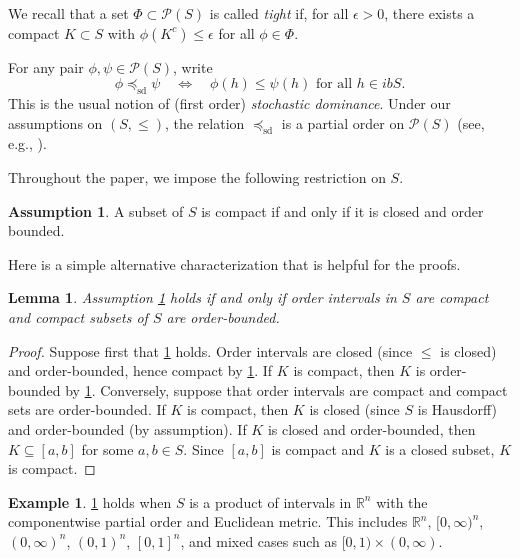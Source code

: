 \documentclass[12pt,reqno]{amsart}
\numberwithin{equation}{section}
\newtheorem{lemma}{Lemma}[section]
\theoremstyle{definition}
\newtheorem{assumption}{Assumption}[section]
\newtheorem{example}{Example}[section]
\newcommand{\1}{\mathbbm{1}}
\newcommand{\RR}{\mathbb{R}}
\newcommand{\pP}{\mathscr{P}}
\newcommand{\precsd}{\preceq_{\textrm{sd}}}
\newcommand{\navy}[1]{\textit{\textcolor{blue!40!black}{#1}}}
\begin{document}
We recall that a set $\Phi \subset \pP(S)$ is called \navy{tight} if,
for all
        $\epsilon > 0$, there exists a compact $K \subset S$ with $\phi(K^c) \leq
        \epsilon$ for all $\phi \in \Phi$.

For any pair $\phi, \psi \in \pP(S)$, write 
%
\begin{equation*}
    \phi \precsd \psi 
    \quad \iff \quad
    \phi(h) \leq \psi(h) \text{ for all $h \in ibS$}.
\end{equation*}
%
This is the usual notion of (first order) \navy{stochastic dominance}. Under our
assumptions on $(S, \leq)$, the relation $\precsd$ is a partial order on
$\pP(S)$ (see, e.g., \cite{kamae1978stochastic}). 

Throughout the paper, we impose the following restriction on $S$.

\begin{assumption}\label{a:pos}
    A subset of $S$ is compact if and only if it is closed and order bounded.
\end{assumption}

Here is a simple alternative characterization that is helpful for the proofs.

\begin{lemma}\label{l:cobeq}
    Assumption \ref{a:pos} holds if and only if order intervals in $S$ are
    compact and compact subsets of $S$ are order-bounded.
\end{lemma}

\begin{proof}
    Suppose first that \cref{a:pos} holds.  Order intervals are closed (since
    $\leq$ is closed) and order-bounded, hence compact by \cref{a:pos}.  If $K$ is compact, then $K$
    is order-bounded by \cref{a:pos}.  Conversely, suppose that order intervals
    are compact and compact sets are order-bounded.  If $K$ is compact, then $K$
    is closed (since $S$ is Hausdorff) and order-bounded (by assumption).  If
    $K$ is closed and order-bounded, then $K \subseteq [a,b]$ for some $a, b \in
    S$.  Since $[a,b]$ is compact and $K$ is a closed subset, $K$ is compact.
\end{proof}

\begin{example}\label{ex:pos}
    \cref{a:pos} holds when $S$ is a product of intervals in $\RR^n$ with the
    componentwise partial order and Euclidean metric. This includes $\RR^n$,
    $[0,\infty)^n$, $(0,\infty)^n$, $(0,1)^n$, $[0,1]^n$, and mixed cases such as $[0,1)
    \times (0,\infty)$.
\end{example}
\end{document}
